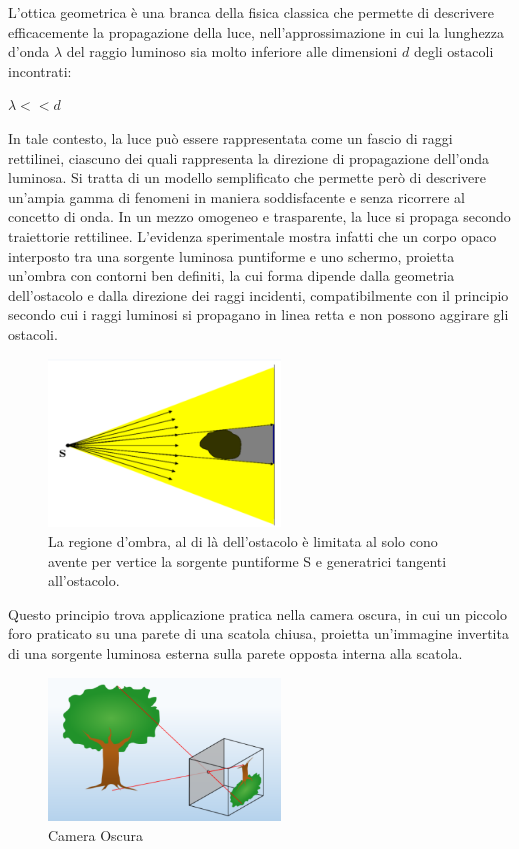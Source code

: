 L'ottica geometrica è una branca della fisica classica che permette di descrivere 
efficacemente la propagazione della luce, nell'approssimazione in cui la lunghezza d'onda $\lambda$ del raggio luminoso 
sia molto inferiore alle dimensioni $d$ degli ostacoli incontrati: 
\begin{center}
	$\lambda << d$
\end{center}
In tale contesto, la luce può essere rappresentata come un fascio di raggi rettilinei, 
ciascuno dei quali rappresenta la direzione di propagazione dell'onda luminosa. Si tratta di un modello semplificato che 
permette però di descrivere un'ampia gamma di fenomeni in maniera soddisfacente e senza ricorrere al concetto di onda. In un mezzo omogeneo e trasparente, la luce si propaga secondo traiettorie rettilinee. 
L'evidenza sperimentale mostra infatti che  un corpo opaco interposto tra una sorgente luminosa puntiforme e uno schermo, 
proietta un'ombra con contorni ben definiti, la cui forma dipende dalla geometria dell'ostacolo e dalla direzione dei raggi incidenti, 
compatibilmente con il principio secondo cui i raggi luminosi si propagano in linea retta e non possono aggirare gli ostacoli.
\begin{figure}[H]
	\centering
	\includegraphics[width=0.55\textwidth]{./figures/pendolo.png}
	\caption{La regione d’ombra, al di là
		dell’ostacolo è limitata al solo
		cono avente per vertice la sorgente
		puntiforme S e generatrici tangenti
		all’ostacolo.}
\end{figure}

Questo principio trova applicazione pratica nella camera oscura, in cui un piccolo foro praticato su una parete di una scatola chiusa, proietta un'immagine invertita di una sorgente 
luminosa esterna sulla parete opposta interna alla scatola.
\begin{figure}[H]
	\centering
	\includegraphics[width=0.55\textwidth]{./figures/camera_oscura.png}
	\caption{Camera Oscura}
\end{figure}

